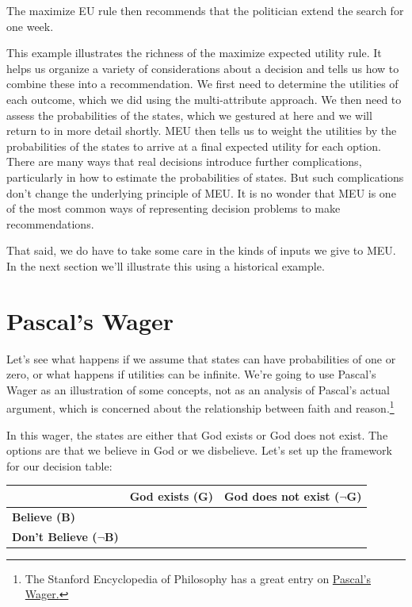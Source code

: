 \documentclass[]{tufte-book}
\begin{document}
The maximize EU rule then recommends that the politician extend the search for one week.

This example illustrates the richness of the maximize expected utility rule. It helps us organize a variety of considerations about a decision and tells us how to combine these into a recommendation. We first need to determine the utilities of each outcome, which we did using the multi-attribute approach. We then need to assess the probabilities of the states, which we gestured at here and we will return to in more detail shortly. MEU then tells us to weight the utilities by the probabilities of the states to arrive at a final expected utility for each option. There are many ways that real decisions introduce further complications, particularly in how to estimate the probabilities of states. But such complications don't change the underlying principle of MEU. It is no wonder that MEU is one of the most common ways of representing decision problems to make recommendations.

That said, we do have to take some care in the kinds of inputs we give to MEU. In the next section we'll illustrate this using a historical example.

\hypertarget{pascals-wager}{%
\section{Pascal's Wager}\label{pascals-wager}}

Let's see what happens if we assume that states can have probabilities of one or zero, or what happens if utilities can be infinite. We're going to use Pascal's Wager as an illustration of some concepts, not as an analysis of Pascal's actual argument, which is concerned about the relationship between faith and reason.\footnote{The Stanford Encyclopedia of Philosophy has a great entry on \href{https://plato.stanford.edu/entries/pascal-wager/}{Pascal's Wager.}}

In this wager, the states are either that God exists or God does not exist. The options are that we believe in God or we disbelieve. Let's set up the framework for our decision table:

\begin{longtable}[]{@{}lcc@{}}
\toprule
& God exists (G) & God does not exist (\(\neg\)G)\tabularnewline
\midrule
\endhead
\textbf{Believe (B)} & &\tabularnewline
\textbf{Don't Believe (\(\neg\)B)} & &\tabularnewline
\bottomrule
\end{longtable}
\end{document}
